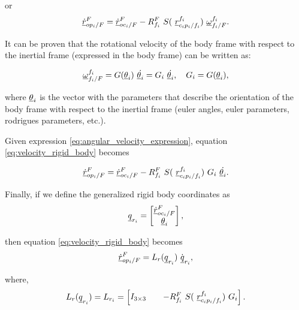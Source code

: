 or
\begin{equation}
    \pvec{\dot{r}}{op_{i}}{F}{F} = \pvec{\dot{r}}{oc_{i}}{F}{F} - 
    \rot{R}{f_{i}}{F} \ S( \ \pvec{r}{c_{i}p_{i}}{f_i}{f_i})\ \pvec{\omega}{f_{i}}{F}{f_i}.
    \label{eq:velocity_rigid_body}
\end{equation}

It can be proven that the rotational velocity of the body frame with respect to
the inertial frame (expressed in the body frame) can be written as:

\begin{equation}
    \pvec{\omega}{f_{i}}{F}{f_i} = G(\vecd{\theta}_{i}) \ \dot{\vecd{\theta}_{i}} = 
    G_{i} \ \dot{\vecd{\theta}_{i}}, \quad G_{i} = G(\vecd{\theta}_{i}),  
    \label{eq:angular_velocity_expression}
\end{equation}

where $\underline{\theta}_{i}$ is the vector with the parameters that describe the orientation 
of the body frame with respect to the inertial frame (euler angles, euler parameters,
rodrigues parameters, etc.).

Given expression \eqref{eq:angular_velocity_expression}, equation \eqref{eq:velocity_rigid_body}
becomes    

\[
    \pvec{\dot{r}}{op_{i}}{F}{F} = \pvec{\dot{r}}{oc_{i}}{F}{F} - 
    \rot{R}{f_{i}}{F} \ S( \ \pvec{r}{c_{i}p_{i}}{f_i}{f_i})\ 
    G_{i}\ \dot{\vecd{\theta}_{i}}.
\]

Finally, if we define the generalized rigid body coordinates as 
\begin{equation}
    \vecd{q}_{r_{i}} = \begin{bmatrix}
        \pvec{\dot{r}}{oc_{i}}{F}{F} \\  \vecd{\theta}_{i}
    \end{bmatrix},
    \label{eq:rigid_body_coordinates}
\end{equation}

then equation \eqref{eq:velocity_rigid_body} becomes
\begin{equation}
    \pvec{\dot{r}}{op_{i}}{F}{F} = L_{r}(\vecd{q}_{r_{i}}) \ \dot{\vecd{q}}_{r_{i}},
    \label{eq:velocity_rigid_body_matrix}
\end{equation}

where,
\begin{equation}
    L_{r}(\vecd{q}_{r_{i}}) = L_{r_i} = \begin{bmatrix}
    I_{3 \times 3} && -\rot{R}{f_{i}}{F} \ S( \ \pvec{r}{c_{i}p_{i}}{f_i}{f_i})\ G_{i}         
    \label{eq:lamda_mat_rigid_body}
    \end{bmatrix}.
\end{equation}

